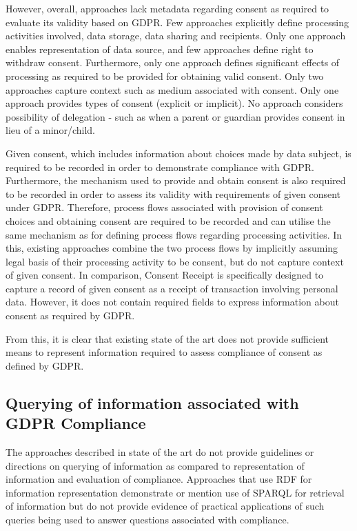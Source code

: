 However, overall, approaches lack metadata regarding consent as required to evaluate its validity based on GDPR. Few approaches explicitly define  processing activities involved, data storage, data sharing and recipients. Only one approach enables representation of data source, and few approaches define right to withdraw consent. Furthermore, only one approach defines significant effects of processing as required to be provided for obtaining valid consent. Only two approaches capture context such as medium associated with consent. Only one approach provides types of consent (explicit or implicit). No approach considers possibility of delegation - such as when a parent or guardian provides consent in lieu of a minor/child.

Given consent, which includes information about choices made by data subject, is required to be recorded in order to demonstrate compliance with GDPR. Furthermore, the mechanism used to provide and obtain consent is also required to be recorded in order to assess its validity with requirements of given consent under GDPR. Therefore, process flows associated with provision of consent choices and obtaining consent are required to be recorded and can utilise the same mechanism as for defining process flows regarding processing activities. In this, existing approaches combine the two process flows by implicitly assuming legal basis of their processing activity to be consent, but do not capture context of given consent. In comparison, Consent Receipt is specifically designed to capture a record of given consent as a receipt of transaction involving personal data. However, it does not contain required fields to express information about consent as required by GDPR.

From this, it is clear that existing state of the art does not provide sufficient means to represent information required to assess compliance of consent as defined by GDPR. 

\subsection{Querying of information associated with GDPR Compliance}
The approaches described in state of the art do not provide guidelines or directions on querying of information as compared to representation of information and evaluation of compliance. Approaches that use RDF for information representation demonstrate or mention use of SPARQL for retrieval of information but do not provide evidence of practical applications of such queries being used to answer questions associated with compliance.

